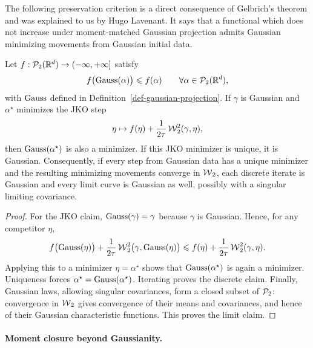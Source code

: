 The following preservation criterion is a direct consequence of Gelbrich's theorem and was explained to us by Hugo Lavenant. It says that a functional which does not increase under moment-matched Gaussian projection admits Gaussian minimizing movements from Gaussian initial data.

\begin{thm}\label{thm-lavenant-gaussian-preserving-jko}
	Let $f:\mathcal{P}_2(\mathbb{R}^d)\to(-\infty,+\infty]$ satisfy
	\[
		f\bigl(\operatorname{Gauss}(\alpha)\bigr)\leqslant f(\alpha)
		\qquad\forall\alpha\in\mathcal{P}_2(\mathbb{R}^d),
	\]
	with $\operatorname{Gauss}$ defined in Definition~\ref{def-gaussian-projection}. If $\gamma$ is Gaussian and $\alpha^\star$ minimizes the JKO step
	\[
		\eta\mapsto f(\eta)+\frac1{2\tau}\operatorname{\mathcal{W}}_2^2(\gamma,\eta),
	\]
	then $\operatorname{Gauss}(\alpha^\star)$ is also a minimizer. If this JKO minimizer is unique, it is Gaussian. Consequently, if every step from Gaussian data has a unique minimizer and the resulting minimizing movements converge in $\operatorname{\mathcal{W}}_2$, each discrete iterate is Gaussian and every limit curve is Gaussian as well, possibly with a singular limiting covariance.
\end{thm}

\begin{proof}
	For the JKO claim, $\operatorname{Gauss}(\gamma)=\gamma$ because $\gamma$ is Gaussian. Hence, for any competitor $\eta$,
	\[
		f\bigl(\operatorname{Gauss}(\eta)\bigr)+\frac1{2\tau}\operatorname{\mathcal{W}}_2^2\bigl(\gamma,\operatorname{Gauss}(\eta)\bigr)
		\leqslant
		f(\eta)+\frac1{2\tau}\operatorname{\mathcal{W}}_2^2(\gamma,\eta).
	\]
	Applying this to a minimizer $\eta=\alpha^\star$ shows that $\operatorname{Gauss}(\alpha^\star)$ is again a minimizer. Uniqueness forces $\alpha^\star=\operatorname{Gauss}(\alpha^\star)$. Iterating proves the discrete claim. Finally, Gaussian laws, allowing singular covariances, form a closed subset of $\mathcal{P}_2$: convergence in $\operatorname{\mathcal{W}}_2$ gives convergence of their means and covariances, and hence of their Gaussian characteristic functions. This proves the limit claim.
\end{proof}

\paragraph{Moment closure beyond Gaussianity.}

